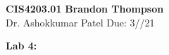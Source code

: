 \noindent
\textbf{CIS4203.01} \hfill \textbf{Brandon Thompson} \\
\normalsize Dr. Ashokkumar Patel \hfill Due: 3//21\\

\begin{center}
\textbf{Lab 4:}
\end{center}